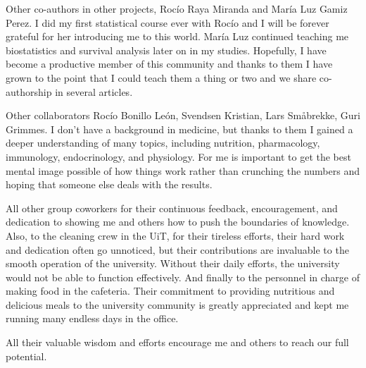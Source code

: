 \documentclass[12pt,twoside,a4paper,fleqn, english]{report}
\begin{document}
    Other co-authors in other projects, Rocío Raya Miranda and María Luz Gamiz Perez. I did my first statistical course ever with Rocío and I will be forever grateful for her introducing me to this world. María Luz continued teaching me biostatistics and survival analysis later on in my studies. Hopefully, I have become a productive member of this community and thanks to them I have grown to the point that I could teach them a thing or two and we share co-authorship in several articles.

    Other collaborators Rocío Bonillo León, Svendsen Kristian, Lars Småbrekke, Guri Grimmes. I don't have a background in medicine, but thanks to them I gained a deeper understanding of many topics, including nutrition, pharmacology, immunology, endocrinology, and physiology. For me is important to get the best mental image possible of how things work rather than crunching the numbers and hoping that someone else deals with the results.

    All other group coworkers for their continuous feedback, encouragement, and dedication to showing me and others how to push the boundaries of knowledge. Also, to the cleaning crew in the UiT, for their tireless efforts, their hard work and dedication often go unnoticed, but their contributions are invaluable to the smooth operation of the university. Without their daily efforts, the university would not be able to function effectively. And finally to the personnel in charge of making food in the cafeteria. Their commitment to providing nutritious and delicious meals to the university community is greatly appreciated and kept me running many endless days in the office.

    All their valuable wisdom and efforts encourage me and others to reach our full potential.

\cleardoublepage




%
\end{document}
